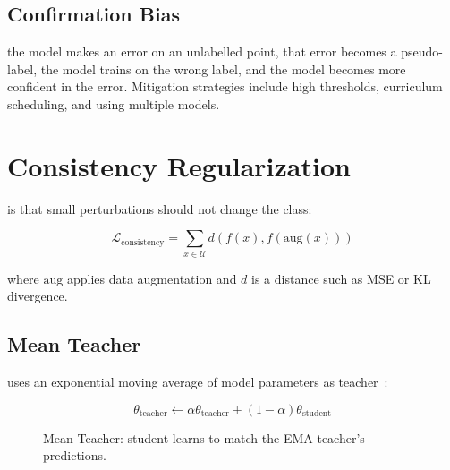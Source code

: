 \subsection{Confirmation Bias}


 the model makes an error on an unlabelled point, that error becomes a pseudo-label, the model trains on the wrong label, and the model becomes more confident in the error. Mitigation strategies include high thresholds, curriculum scheduling, and using multiple models.


\section{Consistency Regularization}


 is that small perturbations should not change the class:

\begin{equation}
    \mathcal{L}_{\text{consistency}} = \sum_{x \in \mathcal{U}} d(f(x), f(\text{aug}(x)))
\end{equation}

where $\text{aug}$ applies data augmentation and $d$ is a distance such as MSE or KL divergence.

\subsection{Mean Teacher}

 uses an exponential moving average of model parameters as teacher~\cite{Tarvainen2017MeanTeacher}:

\begin{equation}
    \theta_{\text{teacher}} \gets \alpha \theta_{\text{teacher}} + (1 - \alpha) \theta_{\text{student}}
\end{equation}

\begin{figure}
\centering
{}
\caption{Mean Teacher: student learns to match the EMA teacher's predictions.}
\label{fig:mean_teacher}
\end{figure}


